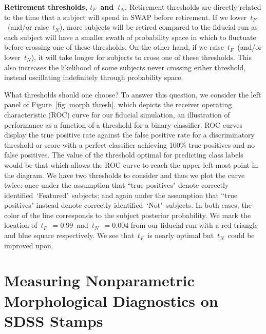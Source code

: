 \documentclass[twocolumn]{aastex6}
\newcommand{\tf}{$t_F$}
\newcommand{\tn}{$t_N$}
\newcommand{\feat}{`Featured'}
\newcommand{\notfeat}{`Not'}
\begin{document}
\textbf{Retirement thresholds, \tf~and~\tn.}
Retirement thresholds are directly related to the time that a subject will spend
in SWAP before retirement.  If we lower~\tf~(and/or raise~\tn), more subjects will be retired
compared to the fiducial run as each subject will have a smaller swath of probability space
in which to fluctuate before crossing one of these thresholds.
On the other hand, if we raise~\tf~(and/or lower~\tn), it will take longer for subjects
to cross one of these thresholds. This also increases the likelihood of some subjects 
never crossing either threshold, instead oscillating indefinitely through probability space.

What thresholds should one choose? To answer this question, we consider the left panel of
Figure~\ref{fig: morph thresh}, which depicts the receiver operating 
characteristic (ROC) curve for our fiducial simulation, an illustration of performance as a 
function of a threshold for a binary classifier. 
ROC curves display the true positive rate against the false positive rate for 
a discriminatory threshold or score with a perfect classifier achieving 100\% true positives
and no false positives. The value of the threshold optimal for predicting class labels would 
be that which allows the ROC curve to reach the upper-left-most point in the diagram. 
We have two thresholds to consider and thus we plot the curve twice: 
once under the assumption that ``true positives" denote correctly identified~\feat~subjects; 
and again under the assumption that ``true positives" instead denote correctly identified~\notfeat~subjects.  In both cases, the color of the line corresponds to the 
subject posterior probability. We mark the location of~\tf~$=0.99$~and~\tn~$=0.004$
from our fiducial run with a red triangle and blue square respectively. 
 We see that~\tf~is nearly optimal but~\tn~could be improved upon. 





\section{Measuring Nonparametric Morphological Diagnostics on SDSS Stamps}
\label{sec: measuring morphology}
\end{document}

